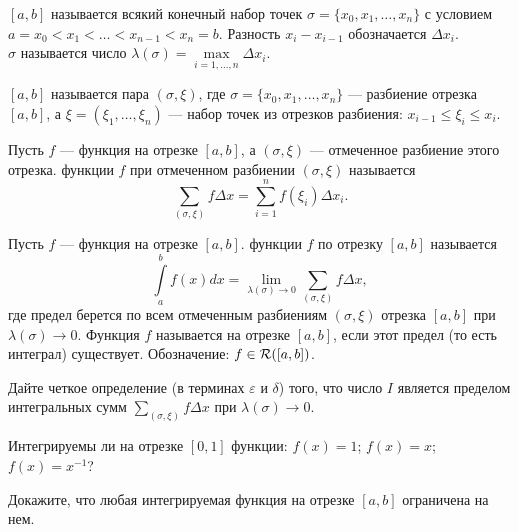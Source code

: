 \documentclass[a4paper, 11pt]{article}
\newcommand{\0}[1]{\overline{#1}}
\newcommand{\RpR}{{\cal R}([a,b])}
\begin{document}





   $[a,b]$
называется всякий конечный набор точек $\sigma=\{x_0,x_1,\ldots,x_n\}$
с условием
$a=x_0<x_1 <\ldots<x_{n-1}<x_n=b$. Разность $x_i-x_{i-1}$ обозначается
$\Delta x_i$.\\
  $\sigma$
называется число $\lambda(\sigma)=\max\limits_{i=1,\ldots,n}\Delta x_i$.

   $[a,b]$
называется пара $(\sigma,\xi)$, где $\sigma=\{x_0,x_1,\ldots,x_n\}$
--- разбиение отрезка $[a,b]$, а $\xi = (\xi_1,\dots,\xi_n)$ --- набор точек
из отрезков разбиения: $x_{i-1}\le \xi_i \le x_i$.

 Пусть $f$ --- функция на отрезке $[a,b]$, а $(\sigma,\xi)$ --- отмеченное разбиение этого отрезка.  функции $f$ при отмеченном разбиении $(\sigma,\xi)$ называется
$$
\sum_{(\sigma,\xi)}f\Delta x= \sum_{i=1}^nf(\xi_i)\Delta x_i.
$$

 Пусть $f$ --- функция на отрезке $[a,b]$.  функции $f$ по отрезку $[a,b]$ называется
$$
\int\limits_a^bf(x)dx=\lim_{\lambda(\sigma)\to0}\sum_{(\sigma,\xi)}f\Delta x,
$$
где предел берется по всем отмеченным разбиениям $(\sigma,\xi)$ отрезка $[a,b]$ при $\lambda(\sigma)\to0$.
Функция $f$ называется  на отрезке $[a,b]$, если этот предел (то есть интеграл) существует. Обозначение: $f\in \RpR$.

Дайте четкое определение (в терминах $\varepsilon$ и $\delta$) того, что число $I$ является пределом интегральных сумм $\sum_{(\sigma,\xi)}f\Delta x$ при $\lambda(\sigma)\to0$.

 Интегрируемы ли  на отрезке $[0,1]$ функции:
     $f(x)=1$;
     $f(x)=x$;
    $f(x)=x^{-1}$?

Докажите, что любая интегрируемая функция на отрезке $[a,b]$ ограничена на нем.
\end{document}
